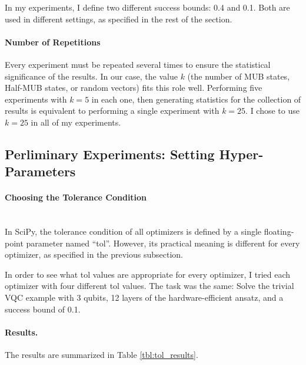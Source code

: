 \documentclass[a4paper,12pt]{article}
\begin{document}
In my experiments, I define two different success bounds: 0.4 and 0.1.
Both are used in different settings, as specified in the rest of the section.

\paragraph*{Number of Repetitions}
Every experiment must be repeated several times to ensure the statistical significance of the results. In our case, the value $k$ (the number of MUB states, Half-MUB states, or random vectors) fits this role well.
Performing five experiments with $k=5$ in each one, then generating statistics for the collection of results is equivalent to performing a single experiment with $k=25$.
I chose to use $k=25$ in all of my experiments.

\subsection{Perliminary Experiments: Setting Hyper-Parameters} \label{subsec:exp_hyperparams}

\paragraph*{Choosing the Tolerance Condition}~\\
In SciPy, the tolerance condition of all optimizers is defined by a single floating-point parameter named ``tol''. However, its practical meaning is different for every optimizer, as specified in the previous subsection.

In order to see what tol values are appropriate for every optimizer, I tried each optimizer with four different tol values.
The task was the same: Solve the trivial VQC example with 3 qubits, 12 layers of the hardware-efficient ansatz, and a success bound of 0.1.

\paragraph*{Results.}
The results are summarized in Table \ref{tbl:tol_results}.
\end{document}
